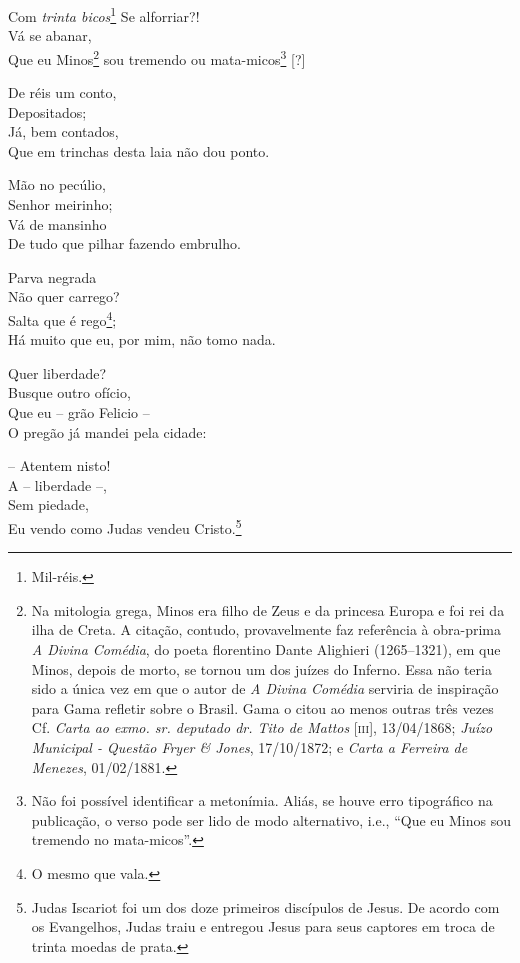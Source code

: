 Com \emph{trinta bicos}\footnote{ Mil-réis.}\emph{\hfill\break
} Se alforriar?!\\
Vá se abanar,\\
Que eu Minos\footnote{ Na mitologia grega, Minos era filho de Zeus e da
  princesa Europa e foi rei da ilha de Creta. A citação, contudo,
  provavelmente faz referência à obra-prima \emph{A Divina Comédia}, do
  poeta florentino Dante Alighieri (1265--1321), em que Minos, depois de
  morto, se tornou um dos juízes do Inferno. Essa não teria sido a única
  vez em que o autor de \emph{A Divina Comédia} serviria de inspiração
  para Gama refletir sobre o Brasil. Gama o citou ao menos outras três
  vezes Cf. \emph{Carta ao exmo. sr. deputado dr. Tito de Mattos}
  {[}\textsc{iii}{]}, 13/04/1868; \emph{Juízo Municipal - Questão Fryer \&
  Jones}, 17/10/1872; e \emph{Carta a Ferreira de Menezes}, 01/02/1881.}
sou tremendo ou mata-micos\footnote{ Não foi possível identificar a
  metonímia. Aliás, se houve erro tipográfico na publicação, o verso
  pode ser lido de modo alternativo, i.e., ``Que eu Minos sou tremendo no
  mata-micos''.} {[}?{]}

De réis um conto,\\
Depositados;\\
Já, bem contados,\\
Que em trinchas desta laia não dou ponto.

Mão no pecúlio,\\
Senhor meirinho;\\
Vá de mansinho\\
De tudo que pilhar fazendo embrulho.

Parva negrada\\
Não quer carrego?\\
Salta que é rego\footnote{ O mesmo que vala.};\\
Há muito que eu, por mim, não tomo nada.

Quer liberdade?\\
Busque outro ofício,\\
Que eu -- grão Felicio --\\
O pregão já mandei pela cidade:

-- Atentem nisto!\\
A -- liberdade --,\\
Sem piedade,\\
Eu vendo como Judas vendeu Cristo.\footnote{ Judas Iscariot foi um dos
  doze primeiros discípulos de Jesus. De acordo com os Evangelhos, Judas
  traiu e entregou Jesus para seus captores em troca de trinta moedas de
  prata.}

